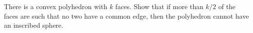 There is a convex polyhedron with $k$ faces.
Show that if more than $k/2$ of the faces are such that no two have a common edge,
then the polyhedron cannot have an inscribed sphere.